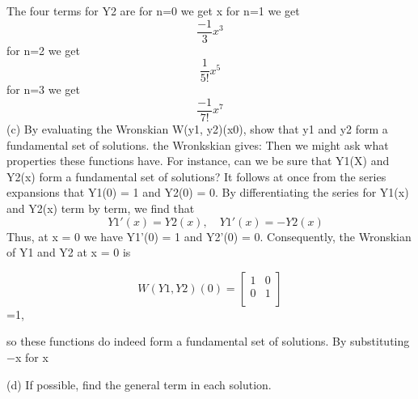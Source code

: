 \documentclass[onecolumn]{IEEEtran}
\begin{document}
     The four terms for Y2 are
    for n=0 we get x
      for n=1 we get
    \begin{equation}
      \frac{-1}{3}x^{3}
    \end{equation}
     for n=2 we get
      \begin{equation}
      \frac{1}{5!}x^{5}
    \end{equation}
     for n=3 we get
      \begin{equation}
      \frac{-1}{7!}x^{7}
    \end{equation}
    (c) By evaluating the Wronskian W(y1, y2)(x0), show that y1 and y2 form a fundamental set of solutions.
    the Wronkskian gives:
    Then we might ask what properties these functions have. For instance, can we be sure
that Y1(X) and Y2(x) form a fundamental set of solutions? It follows at once from the
series expansions that Y1(0) = 1 and Y2(0) = 0. By differentiating the series for Y1(x)
and Y2(x) term by term, we find that
    \begin{equation}
        \quad Y1'(x)=Y2(x), \quad Y1'(x)=-Y2(x)
    \end{equation}
    Thus, at x = 0 we have \quad Y1'(0) = 1 and \quad Y2'(0) = 0. Consequently, the Wronskian of Y1
and Y2 at x = 0 is
   
       \[    W(Y1,Y2)(0)= \left[ {\begin{array}{cc}
   1 & 0 \\
   0 & 1 \\
  \end{array} } \right]\]=1,
   
    
    so these functions do indeed form a fundamental set of solutions. By substituting −x
for x
    
    (d) If possible, find the general term in each solution.
    
\end{document}
